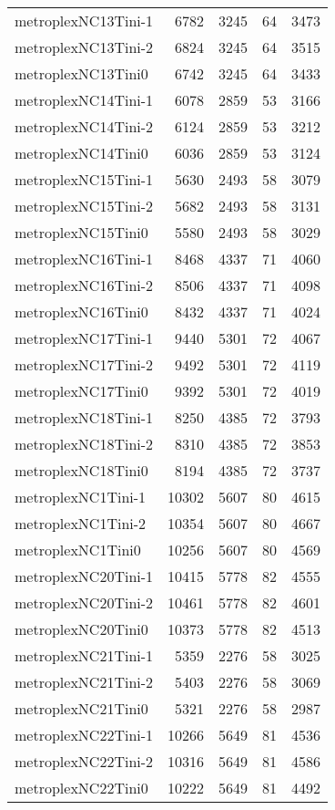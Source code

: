 \begin{longtable}{lrrrr}
metroplexNC13Tini-1 & 6782 & 3245 & 64 & 3473 \\
metroplexNC13Tini-2 & 6824 & 3245 & 64 & 3515 \\
metroplexNC13Tini0 & 6742 & 3245 & 64 & 3433 \\
metroplexNC14Tini-1 & 6078 & 2859 & 53 & 3166 \\
metroplexNC14Tini-2 & 6124 & 2859 & 53 & 3212 \\
metroplexNC14Tini0 & 6036 & 2859 & 53 & 3124 \\
metroplexNC15Tini-1 & 5630 & 2493 & 58 & 3079 \\
metroplexNC15Tini-2 & 5682 & 2493 & 58 & 3131 \\
metroplexNC15Tini0 & 5580 & 2493 & 58 & 3029 \\
metroplexNC16Tini-1 & 8468 & 4337 & 71 & 4060 \\
metroplexNC16Tini-2 & 8506 & 4337 & 71 & 4098 \\
metroplexNC16Tini0 & 8432 & 4337 & 71 & 4024 \\
metroplexNC17Tini-1 & 9440 & 5301 & 72 & 4067 \\
metroplexNC17Tini-2 & 9492 & 5301 & 72 & 4119 \\
metroplexNC17Tini0 & 9392 & 5301 & 72 & 4019 \\
metroplexNC18Tini-1 & 8250 & 4385 & 72 & 3793 \\
metroplexNC18Tini-2 & 8310 & 4385 & 72 & 3853 \\
metroplexNC18Tini0 & 8194 & 4385 & 72 & 3737 \\
metroplexNC1Tini-1 & 10302 & 5607 & 80 & 4615 \\
metroplexNC1Tini-2 & 10354 & 5607 & 80 & 4667 \\
metroplexNC1Tini0 & 10256 & 5607 & 80 & 4569 \\
metroplexNC20Tini-1 & 10415 & 5778 & 82 & 4555 \\
metroplexNC20Tini-2 & 10461 & 5778 & 82 & 4601 \\
metroplexNC20Tini0 & 10373 & 5778 & 82 & 4513 \\
metroplexNC21Tini-1 & 5359 & 2276 & 58 & 3025 \\
metroplexNC21Tini-2 & 5403 & 2276 & 58 & 3069 \\
metroplexNC21Tini0 & 5321 & 2276 & 58 & 2987 \\
metroplexNC22Tini-1 & 10266 & 5649 & 81 & 4536 \\
metroplexNC22Tini-2 & 10316 & 5649 & 81 & 4586 \\
metroplexNC22Tini0 & 10222 & 5649 & 81 & 4492 \\

\end{longtable}
